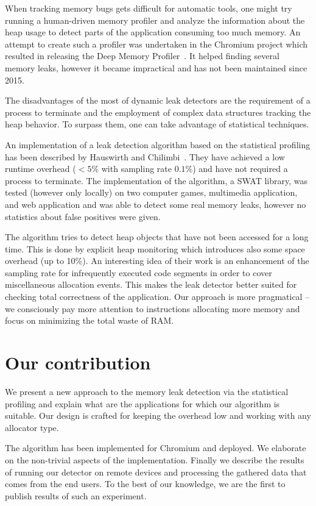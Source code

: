 \documentclass[preprint, numbers]{sigplanconf}
\newcommand{\comment}[1]{{\color{blue}{#1}}}
\begin{document}
When tracking memory bugs gets difficult for automatic tools, one might
try running a human-driven memory profiler and analyze the information about the heap usage
to detect parts of the application consuming too much memory.
An attempt to create such a profiler was undertaken in the Chromium project
which resulted in releasing the
Deep Memory Profiler~\cite{deep}.
It helped finding several memory leaks, however it became impractical
and has not been maintained since 2015.

The disadvantages of the most of dynamic leak detectors are the requirement of a process
to terminate and the employment of complex data structures tracking the heap behavior.
To surpass them, one can take advantage of statistical techniques.

An implementation of a leak detection algorithm based on the statistical profiling
has been described by Hauswirth and Chilimbi~\cite{hauswirth}.
They have achieved a low runtime overhead ($<5\%$ with sampling rate $0.1\%$) and have not required a process
to terminate.
The implementation of the algorithm, a SWAT library, was tested (however only locally) on two computer games, multimedia application,
and web application and was able to detect some real memory leaks, however no statistics about false positives were given.

The algorithm tries to detect heap objects that have not been accessed for a long time.
This is done by explicit heap monitoring which introduces also some space overhead (up to 10\%).
An interesting idea of their work is an enhancement of the sampling rate
for infrequently executed code segments in order to cover miscellaneous allocation events.
This makes the leak detector better suited for checking total correctness of
the application.
Our approach is more pragmatical -- we consciously pay more attention to instructions
allocating more memory and focus on minimizing the total waste of RAM.

\section{Our contribution}

We present a new approach to the memory leak detection via the statistical profiling
and explain what are the applications for which our algorithm is suitable.
Our design is crafted for keeping the overhead low and working with any
allocator type.

The algorithm has been implemented for Chromium and deployed.
We elaborate on the non-trivial aspects of the implementation.
Finally we describe the results of running our detector on remote
devices and processing the gathered data that comes from the end users.
To the best of our knowledge, we are the first to publish results
of such an experiment.
\comment{Mention briefly about the results.}
\end{document}
